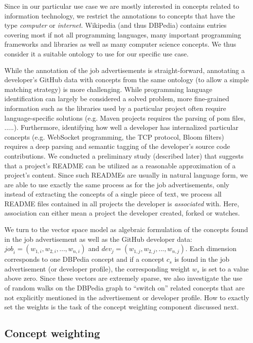 \documentclass[conference]{IEEEtran}
\begin{document}
Since in our particular use case we are mostly interested in concepts related to information technology, we restrict the annotations to concepts that have the type \emph{computer} or \emph{internet}. Wikipedia (and thus DBPedia) contains entries covering most if not all programming languages, many important programming frameworks and libraries as well as many computer science concepts. We thus consider it a suitable ontology to use for our specific use case.

While the annotation of the job advertisements is straight-forward, annotating a developer's GitHub data with concepts from the same ontology (to allow a simple matching strategy) is more challenging. While programming language identification can largely be considered a solved problem, more fine-grained information such as the libraries used by a particular project often require language-specific solutions (e.g. Maven projects requires the parsing of pom files, .....). Furthermore, identifying how well a developer has internalized particular concepts (e.g. WebSocket programming, the TCP protocol, Bloom filters) requires a deep parsing and semantic tagging of the developer's source code contributions.
We conducted a preliminary study (described later) that suggests that a project's README can be utilized as a reasonable approximation of a project's content. Since such READMEs are usually in natural language form, we are able to use exactly the same process as for the job advertisements, only instead of extracting the concepts of a single piece of text, we process all README files contained in all projects the developer is \emph{associated} with. Here, association can either mean a project the developer created, forked or watches.

We turn to the vector space model as algebraic formulation of the concepts found in the job advertisement as well as the GitHub developer data: $\textit{job}_i=(w_{1,i}, w_{2,i}, ..., w_{n,i})$ and $\textit{dev}_j=(w_{1,j}, w_{2,j}, ..., w_{n,j})$. Each dimension corresponds to one DBPedia concept and if a concept $c_s$ is found in the job advertisement (or developer profile), the corresponding weight $w_{s}$ is set to a value above zero. Since these vectors are extremely sparse, we also investigate the use of random walks on the DBPedia graph to ``switch on'' related concepts that are not explicitly mentioned in the advertisement or developer profile. How to exactly set the weights is the task of the concept weighting component discussed next.

\subsection{Concept weighting}
\end{document}
